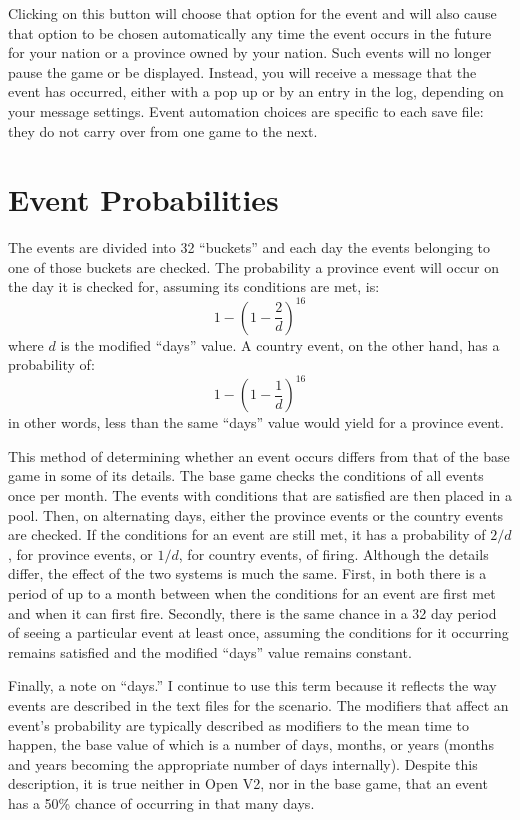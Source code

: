 Clicking on this button will choose that option for the event and will also cause that option to be chosen automatically any time the event occurs in the future for your nation or a province owned by your nation. Such events will no longer pause the game or be displayed. Instead, you will receive a message that the event has occurred, either with a pop up or by an entry in the log, depending on your message settings. Event automation choices are specific to each save file: they do not carry over from one game to the next.

\section{Event Probabilities}
The events are divided into 32 ``buckets'' and each day the events belonging to one of those buckets are checked. The probability a province event will occur on the day it is checked for, assuming its conditions are met, is:
	\[
	1 - \left( 1 - \frac{2}{d} \right)^{16}
\]
where \( d \) is the modified ``days'' value. A country event, on the other hand, has a probability of:
\[
	1 - \left( 1 - \frac{1}{d} \right)^{16}
\]
in other words, less than the same ``days'' value would yield for a province event.

This method of determining whether an event occurs differs from that of the base game in some of its details. The base game checks the conditions of all events once per month. The events with conditions that are satisfied are then placed in a pool. Then, on alternating days, either the province events or the country events are checked. If the conditions for an event are still met, it has a probability of \( 2/d \), for province events, or \( 1/d \), for country events, of firing. Although the details differ, the effect of the two systems is much the same. First, in both there is a period of up to a month between when the conditions for an event are first met and when it can first fire. Secondly, there is the same chance in a 32 day period of seeing a particular event at least once, assuming the conditions for it occurring remains satisfied and the modified ``days'' value remains constant.

Finally, a note on ``days.'' I continue to use this term because it reflects the way events are described in the text files for the scenario. The modifiers that affect an event's probability are typically described as modifiers to the mean time to happen, the base value of which is a number of days, months, or years (months and years becoming the appropriate number of days internally). Despite this description, it is true neither in Open V2, nor in the base game, that an event has a 50\% chance of occurring in that many days.